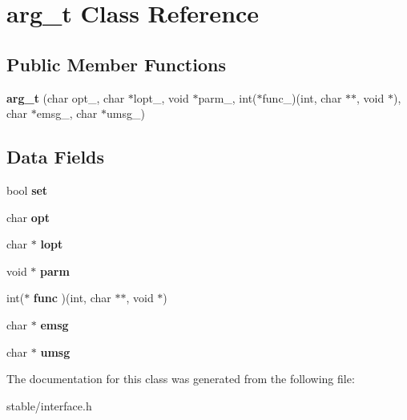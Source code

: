 \hypertarget{classarg__t}{\section{arg\-\_\-t Class Reference}
\label{classarg__t}
}
\subsection*{Public Member Functions}
\begin{DoxyCompactItemize}
\item 
\hypertarget{classarg__t_aa0816102885c0956f557ed2bb7789f83}{{\bfseries arg\-\_\-t} (char opt\-\_\-, char $\ast$lopt\-\_\-, void $\ast$parm\-\_\-, int($\ast$func\-\_\-)(int, char $\ast$$\ast$, void $\ast$), char $\ast$emsg\-\_\-, char $\ast$umsg\-\_\-)}\label{classarg__t_aa0816102885c0956f557ed2bb7789f83}

\end{DoxyCompactItemize}
\subsection*{Data Fields}
\begin{DoxyCompactItemize}
\item 
\hypertarget{classarg__t_a681d5790d7487a756d54d24d4a310611}{bool {\bfseries set}}\label{classarg__t_a681d5790d7487a756d54d24d4a310611}

\item 
\hypertarget{classarg__t_adf0074f9886f987e60fc9a111a22dc23}{char {\bfseries opt}}\label{classarg__t_adf0074f9886f987e60fc9a111a22dc23}

\item 
\hypertarget{classarg__t_a558ffc8c12be9cc9b6712e23925219c0}{char $\ast$ {\bfseries lopt}}\label{classarg__t_a558ffc8c12be9cc9b6712e23925219c0}

\item 
\hypertarget{classarg__t_a5395567b0a31949b094774ba6dc6c10d}{void $\ast$ {\bfseries parm}}\label{classarg__t_a5395567b0a31949b094774ba6dc6c10d}

\item 
\hypertarget{classarg__t_a1056d3714b616261fd36049495026cc0}{int($\ast$ {\bfseries func} )(int, char $\ast$$\ast$, void $\ast$)}\label{classarg__t_a1056d3714b616261fd36049495026cc0}

\item 
\hypertarget{classarg__t_aab8c1d692c18688ed3e01f04ca7e2ea3}{char $\ast$ {\bfseries emsg}}\label{classarg__t_aab8c1d692c18688ed3e01f04ca7e2ea3}

\item 
\hypertarget{classarg__t_a1e3b887bbd417a0339ec430878f3feac}{char $\ast$ {\bfseries umsg}}\label{classarg__t_a1e3b887bbd417a0339ec430878f3feac}

\end{DoxyCompactItemize}


The documentation for this class was generated from the following file\-:\begin{DoxyCompactItemize}
\item 
stable/interface.\-h\end{DoxyCompactItemize}
